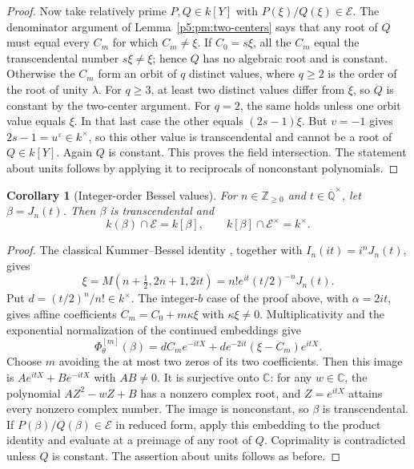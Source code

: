 \documentclass[11pt,a4paper]{article}
\newtheorem{corollary}[theorem]{Corollary}
\theoremstyle{definition}
\theoremstyle{remark}
\numberwithin{equation}{section}
\begin{document}
\begin{proof}
Now take relatively prime $P,Q\in k[Y]$ with
$P(\xi)/Q(\xi)\in\mathcal E$.  The denominator argument of
Lemma~\ref{p5:pm:two-centers} says that any root of $Q$ must equal
every $C_m$ for which $C_m\ne\xi$.
If $C_0=s\xi$, all the $C_m$ equal the transcendental number
$s\xi\ne\xi$; hence $Q$ has no algebraic root and is constant.
Otherwise the $C_m$ form an orbit of $q$ distinct values, where
$q\ge2$ is the order of the root of unity $\lambda$.
For $q\ge3$, at least two distinct values differ from $\xi$,
so $Q$ is constant by the two-center argument.
For $q=2$, the same holds unless one orbit value equals $\xi$.
In that last case the other equals $(2s-1)\xi$.  But $v=-1$ gives
$2s-1=u^\varepsilon\in k^\times$, so this other value is transcendental and
cannot be a root of $Q\in k[Y]$.  Again $Q$ is constant.
This proves the field intersection.  The statement about units
follows by applying it to reciprocals of nonconstant polynomials.
\end{proof}

\begin{corollary}[Integer-order Bessel values]
\label{p5:km:bessel}
For $n\in\mathbb Z_{\ge0}$ and
$t\in\overline{\mathbb Q}^{\times}$, let $\beta=J_n(t)$.
Then $\beta$ is transcendental and
\[
 k(\beta)\cap\mathcal E=k[\beta],\qquad
 k[\beta]\cap\mathcal E^\times=k^\times.
\]
\end{corollary}
\begin{proof}
The classical Kummer--Bessel identity
\cite[13.6.9]{p5:DLMF}, together with $I_n(it)=i^nJ_n(t)$, gives
\[
 \xi=M\left(n+\tfrac12,2n+1,2it\right)
       =n!e^{it}(t/2)^{-n}J_n(t).
\]
Put $d=(t/2)^n/n!\in k^\times$.  The integer-$b$ case of the
proof above, with $\alpha=2it$, gives affine coefficients
$C_m=C_0+m\kappa\xi$ with $\kappa\xi\ne0$.  Multiplicativity
and the exponential normalization of the continued embeddings give
\[
 \Phi_\theta^{[m]}(\beta)
   =d C_m e^{-itX}
       +d e^{-2it}(\xi-C_m)e^{itX}.
\]
Choose $m$ avoiding the at most two zeros of its two coefficients.
Then this image is $A e^{itX}+B e^{-itX}$ with $AB\ne0$.
It is surjective onto $\mathbb C$: for any $w\in\mathbb C$,
the polynomial $AZ^2-wZ+B$ has a nonzero complex root, and
$Z=e^{itX}$ attains every nonzero complex number.
The image is nonconstant, so $\beta$ is transcendental.  If
$P(\beta)/Q(\beta)\in\mathcal E$ in reduced form, apply this
embedding to the product identity and evaluate at a preimage of
any root of $Q$.  Coprimality is contradicted unless $Q$ is constant.
The assertion about units follows as before.
\end{proof}
\end{document}
